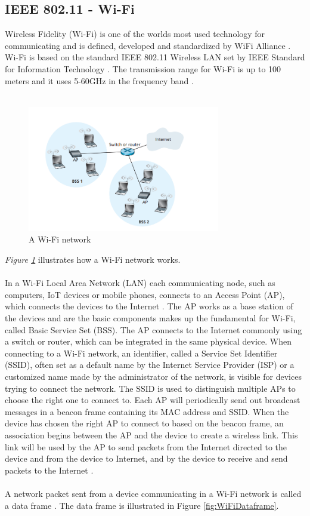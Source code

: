 \subsection{IEEE 802.11 - Wi-Fi}
Wireless Fidelity (Wi-Fi) \cite{WiFiAlliance} is one of the worlds most used technology for communicating and is defined, developed and standardized by WiFi Alliance \cite{WiFiAlliance}. Wi-Fi is based on the standard IEEE 802.11 Wireless LAN set by IEEE Standard for Information Technology \cite{WifiStandard}. The transmission range for Wi-Fi is up to 100 meters and it uses 5-60GHz in the frequency band \cite{IAQMonitorCommunicationReview}.
\\\\
\begin{figure} [!ht]
    \centering
    \includegraphics[width=0.75\textwidth]{figures/WiFiStandard.png}
    \caption{A Wi-Fi network \cite{Datacom}}
    \label{fig:WiFiStandard}
\end{figure}
\textit{Figure \ref{fig:WiFiStandard}} illustrates how a Wi-Fi network works. 
\\\\
In a Wi-Fi Local Area Network (LAN) each communicating node, such as computers, IoT devices or mobile phones, connects to an Access Point (AP), which connects the devices to the Internet \cite{Datacom}. The AP works as a base station of the devices and are the basic components makes up the fundamental for Wi-Fi, called Basic Service Set (BSS). The AP connects to the Internet commonly using a switch or router, which can be integrated in the same physical device. When connecting to a Wi-Fi network, an identifier, called a Service Set Identifier (SSID), often set as a default name by the Internet Service Provider (ISP) or a customized name made by the administrator of the network, is visible for devices trying to connect the network. The SSID is used to distinguish multiple APs to choose the right one to connect to. Each AP will periodically send out broadcast messages in a beacon frame containing its MAC address and SSID. When the device has chosen the right AP to connect to based on the beacon frame, an association begins between the AP and the device to create a wireless link. This link will be used by the AP to send packets from the Internet directed to the device and from the device to Internet, and by the device to receive and send packets to the Internet \cite{Datacom}. 
\\\\
A network packet sent from a device communicating in a Wi-Fi network is called a data frame \cite{Datacom}. The data frame is illustrated in Figure \ref{fig:WiFiDataframe}.

